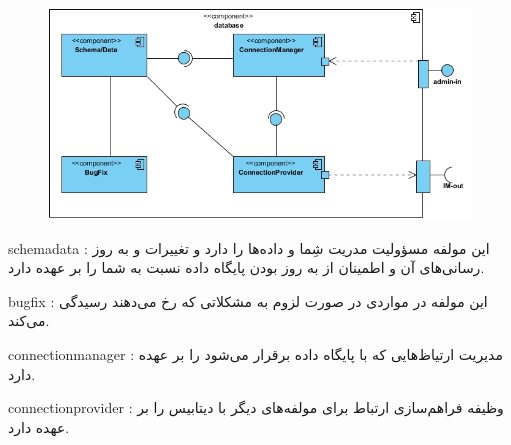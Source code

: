 
\begin{figure}[H]
\centering
\includegraphics[scale=.5]{img/database.jpg}
\caption{}

\end{figure}


\begin{itemize}

	

	 schemadata : این مولفه مسؤولیت مدریت شِما و  داده‌ها را دارد و تغییرات و به روز رسانی‌های آن و اطمینان از به روز بودن پایگاه داده نسبت به شما را بر عهده دارد. 

	 bugfix :  این مولفه در مواردی در صورت لزوم به مشکلاتی که رخ می‌دهند رسیدگی می‌کند.

	 connectionmanager :  مدیریت ارتیاظ‌هایی که با پایگاه داده برقرار می‌شود را بر عهده دارد.

	 connectionprovider : وظیفه فراهم‌سازی ارتباط برای مولفه‌های دیگر با دیتابیس را بر عهده دارد.

	

\end{itemize}






